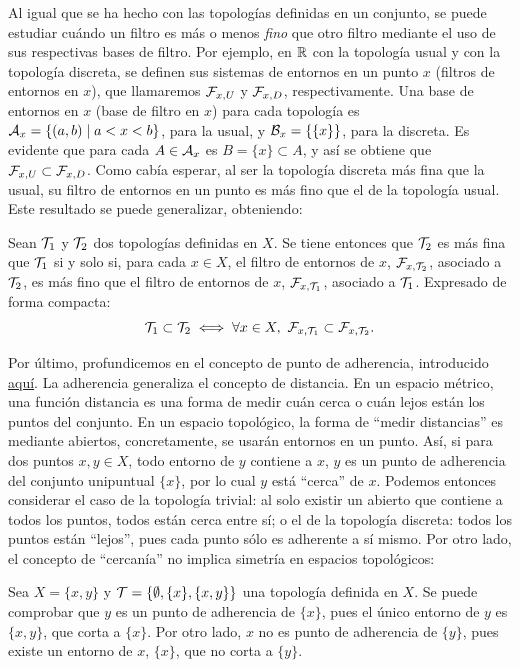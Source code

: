 \begin{amp}
    Al igual que se ha hecho con las topologías definidas en un conjunto, se puede estudiar cuándo un filtro es más o menos {\it fino} que otro filtro mediante el uso de sus respectivas bases de filtro. Por ejemplo, en $\mathbb{R}$ con la topología usual y con la topología discreta, se definen sus sistemas de entornos en un punto $x$ (filtros de entornos en $x$), que llamaremos $\mathcal{F}_{x,U}$ y $\mathcal{F}_{x,D}$, respectivamente. Una base de entornos en $x$ (base de filtro en $x$) para cada topología es $\mathcal{A}_x = \{(a,b)\mid a<x<b\}$, para la usual, y $\mathcal{B}_x = \{\{x\}\}$, para la discreta. Es evidente que para cada $A\in\mathcal{A}_x$ es $B=\{x\}\subset A$, y así se obtiene que $\mathcal{F}_{x,U} \subset \mathcal{F}_{x,D}$. Como cabía esperar, al ser la topología discreta más fina que la usual, su filtro de entornos en un punto es más fino que el de la topología usual. Este resultado se puede generalizar, obteniendo:
    \begin{prop}
        Sean $\mathcal{T}_1$ y $\mathcal{T}_2$ dos topologías definidas en $X$. Se tiene entonces que $\mathcal{T}_2$ es más fina que $\mathcal{T}_1$ si y solo si, para cada $x\in X$, el filtro de entornos de $x$, $\mathcal{F}_{x,\mathcal{T}_2}$, asociado a $\mathcal{T}_2$, es más fino que el filtro de entornos de $x$, $\mathcal{F}_{x,\mathcal{T}_1}$, asociado a $\mathcal{T}_1$. Expresado de forma compacta:
        \[
            \cT_1\subset\cT_2  \iff \forall x\in X,\ \cF_{x,\cT_1}\subset \cF_{x,\cT_2}.
        \]
    \end{prop}

    \bigskip

    Por último, profundicemos en el concepto de punto de adherencia, introducido \hyperlink{def:punto_adherencia}{aquí}. La adherencia generaliza el concepto de distancia. En un espacio métrico, una función distancia es una forma de medir cuán cerca o cuán lejos están los puntos del conjunto. En un espacio topológico, la forma de ``medir distancias'' es mediante abiertos, concretamente, se usarán entornos en un punto. Así, si para dos puntos $x,y\in X$, todo entorno de $y$ contiene a $x$, $y$ es un punto de adherencia del conjunto unipuntual $\{x\}$, por lo cual $y$ está ``cerca'' de $x$. Podemos entonces considerar el caso de la topología trivial: al solo existir un abierto que contiene a todos los puntos, todos están cerca entre sí; o el de la topología discreta: todos los puntos están ``lejos'', pues cada punto sólo es adherente a sí mismo. Por otro lado, el concepto de ``cercanía'' no implica simetría en espacios topológicos:

    \begin{ej}
        Sea $X = \{x,y\}$ y $\mathcal{T} = \{\emptyset, \{x\},\{x,y\}\}$ una topología definida en $X$. Se puede comprobar que $y$ es un punto de adherencia de $\{x\}$, pues el único entorno de $y$ es $\{x,y\}$, que corta a $\{x\}$. Por otro lado, $x$ no es punto de adherencia de $\{y\}$, pues existe un entorno de $x$, $\{x\}$, que no corta a $\{y\}$.
    \end{ej}

\end{amp}


